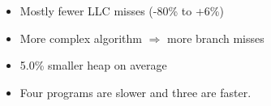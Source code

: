 \begin{frame}
  \begin{itemize}
    \item<1-> Mostly fewer LLC misses (-80\% to +6\%)
    \item<2-> More complex algorithm $\Rightarrow$ more branch misses
    \item<3-> 5.0\% smaller heap on average
    \item<4-> Four programs are slower and three are faster.
  \end{itemize}

\end{frame}
